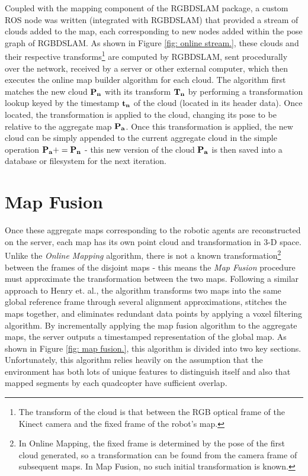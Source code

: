 \documentclass[letterpaper, oneside, 10pt]{report}
\begin{document}
Coupled with the mapping component of the RGBDSLAM package, a custom ROS node was written (integrated with RGBDSLAM) that provided a stream of clouds added to the map, each corresponding to new nodes added within the pose graph of RGBDSLAM. As shown in Figure \ref{fig: online stream.}, these clouds and their respective transforms\footnote{The transform of the cloud is that between the RGB optical frame of the Kinect camera and the fixed frame of the robot's map.} are computed by RGBDSLAM, sent procedurally over the network, received by a server or other external computer, which then executes the online map builder algorithm for each cloud. The algorithm first matches the new cloud $\bf{P_n}$ with its transform $\bf{T_n}$ by performing a transformation lookup keyed by the timestamp $\bf{t_n}$ of the cloud (located in its header data). Once located, the transformation is applied to the cloud, changing its pose to be relative to the aggregate map $\bf{P_a}$. Once this transformation is applied, the new cloud can be simply appended to the current aggregate cloud in the simple operation $\bf{P_a} += \bf{P_n}$  - this new version of the cloud $\bf{P_a}$ is then saved into a database or filesystem for the next iteration.

\section{Map Fusion}
\noindent Once these aggregate maps corresponding to the robotic agents are reconstructed on the server, each map has its own point cloud and transformation in 3-D space. Unlike the \textsl{Online Mapping} algorithm, there is not a known transformation\footnote{In Online Mapping, the fixed frame is determined by the pose of the first cloud generated, so a transformation can be found from the camera frame of subsequent maps. In Map Fusion, no such initial transformation is known.} between the frames of the disjoint maps - this means the \textsl{Map Fusion} procedure must approximate the transformation between the two maps. Following a similar approach to Henry et. al.\cite{henry2012rgb}, the algorithm transforms two maps into the same global reference frame through several alignment approximations, stitches the maps together, and eliminates redundant data points by applying a voxel filtering algorithm. By incrementally applying the map fusion algorithm to the aggregate maps, the server outputs a timestamped representation of the global map. As shown in Figure \ref{fig: map fusion.}, this algorithm is divided into two key sections. Unfortunately, this algorithm relies heavily on the assumption that the environment has both lots of unique features to distinguish itself and also that mapped segments by each quadcopter have sufficient overlap.
\end{document}
